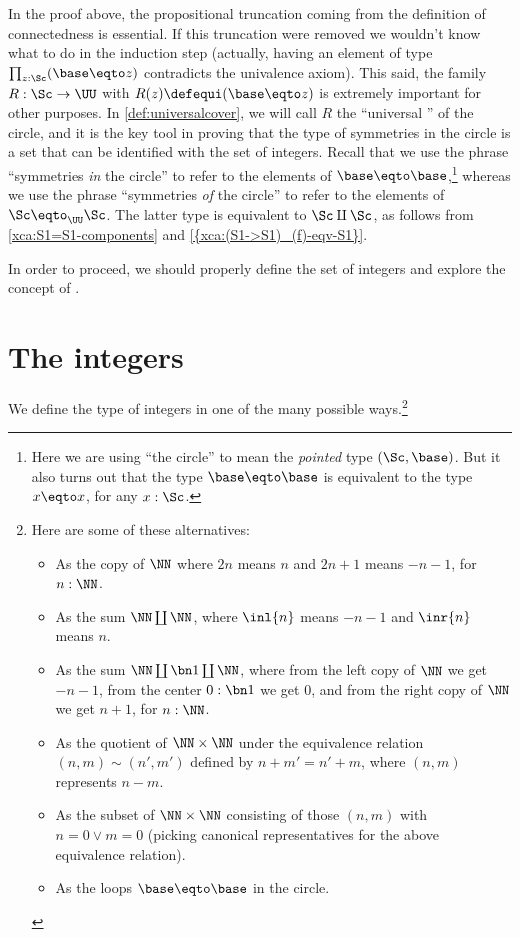 In the proof above, the propositional truncation coming
from the definition of connectedness is essential.
If this truncation were removed we wouldn't know what to do in
the induction step (actually, having an element of type
$\prod_{z:\Sc}(\base\eqto z)$ contradicts the univalence axiom).
This said, the family $R:\Sc\to\UU$ with $R(z)\defequi (\base\eqto z)$
is extremely important for other purposes. In \cref{def:universalcover},
we will call $R$ the ``universal \covering'' of the circle,
and it is the key tool in proving that the type of symmetries in
the circle is a set that can be identified with the set of integers.
Recall that we
use the phrase ``symmetries \emph{in} the circle'' to refer to the
elements of $\base\eqto\base$,\footnote{%
  Here we are using ``the circle'' to mean the
  \emph{pointed} type $(\Sc,\base)$.
  But it also turns out that the type $\base\eqto\base$ is
  equivalent to the type $x\eqto x$, for any $x:\Sc$.}
whereas we use the phrase ``symmetries \emph{of} the circle'' to
refer to the elements of $\Sc\eqto_\UU\Sc$.
The latter type is equivalent to $\Sc\amalg\Sc$,
as follows from \cref{xca:S1=S1-components} and \cref{{xca:(S1->S1)_(f)-eqv-S1}}.

In order to proceed, we should properly define the set of integers
and explore the concept of \coverings.

\section{The integers}
\label{sec:integers}

We define the type of integers in one of the many possible ways.\footnote{%
  \label{ft:many-integers}Here are some of these alternatives:
  \begin{itemize}
  \item As the copy of $\NN$ where $2n$ means $n$ and $2n+1$ means $-n-1$, for $n:\NN$.
  \item As the sum $\NN\coprod\NN$, where $\inl{n}$ means $-n-1$ and $\inr{n}$ means $n$.
  \item As the sum $\NN\coprod\bn1\coprod\NN$, where from the left copy of $\NN$ we get $-n-1$, from the center $0:\bn1$ we get $0$, and from the right copy of $\NN$ we get $n+1$, for $n:\NN$.
  \item As the quotient of $\NN\times\NN$ under the equivalence relation
    $(n,m) \sim (n',m')$ defined by $n+m' = n'+m$,
    where $(n,m)$ represents $n-m$.
  \item As the subset of $\NN\times\NN$ consisting of those $(n,m)$ with $n=0\lor m=0$ (picking canonical representatives for the above equivalence relation).
  \item As the loops $\base\eqto\base$ in the circle. %
  \end{itemize}}

